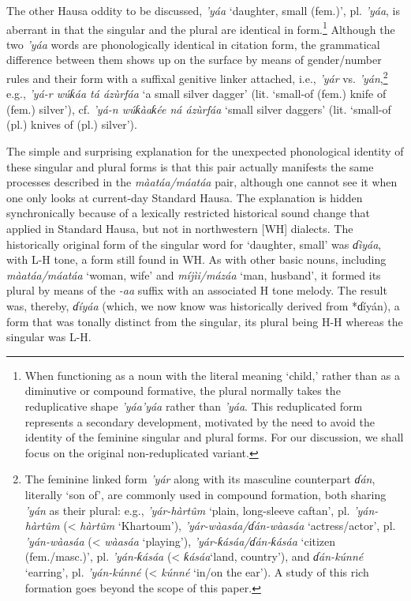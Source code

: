 \documentclass[output=paper,colorlinks,citecolor=brown]{langscibook}
\begin{document}
The other Hausa oddity to be discussed, \textit{’yáa} `daughter, small (fem.)’, pl. \textit{’yáa}, is aberrant in that the singular and the plural are identical in form.\footnote{When functioning as a noun with the literal meaning `child,’ rather than as a diminutive or compound formative, the plural normally takes the reduplicative  shape \textit{’yáa’yáa} rather than \textit{’yáa}. This reduplicated form represents a secondary development, motivated by the need to avoid the identity of the feminine singular and plural forms. For our discussion, we shall focus on the original non-reduplicated variant.} Although the two \textit{’yáa} words are phonologically identical in citation form, the grammatical difference between them shows up on the surface by means of gender/number  rules and their form with a suffixal genitive linker attached, i.e., \textit{’yár} vs. \textit{’yán},\footnote{The feminine linked form \textit{’yár} along with its masculine counterpart \textit{ɗán}, literally `son of’, are commonly used in compound  formation, both sharing \textit{’yán} as their plural: e.g., \textit{’yár-hàrtûm} `plain, long-sleeve caftan’, pl. \textit{’yán-hàrtûm} (< \textit{hàrtûm} ‘Khartoum’), \textit{’yár-wàasáa/ɗán-wàasáa} `actress/actor’, pl. \textit{’yán-wàasáa} (< \textit{wàasáa} `playing’), \textit{’yár-ƙásáa/ɗán-ƙásáa} `citizen (fem./masc.)’, pl. \textit{’yán-ƙásáa} (< \textit{ƙásáa}`land, country’), and \textit{ɗán-kúnné} `earring’, pl. \textit{’yán-kúnné} (< \textit{kúnné} `in/on the ear’). A study of this rich formation goes beyond the scope of this paper.} e.g., \textit{’yá-r wúƙáa tá ázùrfáa} `a small silver dagger’ (lit. `small-of (fem.) knife of (fem.) silver’), cf. \textit{’yá-n wúƙàaƙée ná ázùrfáa} `small silver daggers’ (lit. `small-of (pl.) knives of (pl.) silver’). 
 
The simple and surprising explanation for the unexpected phonological identity of these singular and plural forms is that this pair actually manifests the same processes described in the \textit{màatáa/máatáa} pair, although one cannot see it when one only looks at current-day Standard Hausa. The explanation is hidden synchronically because of a lexically restricted  historical sound change that applied in Standard Hausa, but not in  northwestern [WH] dialects. The historically original form of the singular word for `daughter, small’ was \textit{ɗìyáa}, with L-H tone, a form still found in WH. As with other basic nouns, including \textit{màatáa/máatáa} `woman, wife’ and \textit{míjìi/mázáa} `man, husband’, it formed its plural by means of the \textit{-aa} suffix with an associated H tone  melody. The result was, thereby, \textit{ɗíyáa} (which, we now know was historically derived from *ɗíyán), a form that was tonally distinct from the singular, its plural being H-H whereas the singular was L-H.
\end{document}
